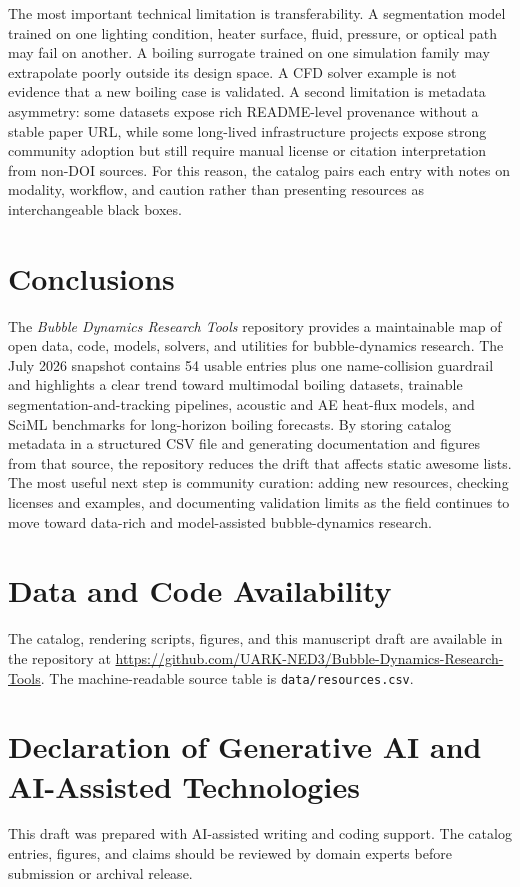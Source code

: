 \documentclass[11pt]{article}
\begin{document}
The most important technical limitation is transferability. A segmentation model trained on one lighting condition, heater surface, fluid, pressure, or optical path may fail on another. A boiling surrogate trained on one simulation family may extrapolate poorly outside its design space. A CFD solver example is not evidence that a new boiling case is validated. A second limitation is metadata asymmetry: some datasets expose rich README-level provenance without a stable paper URL, while some long-lived infrastructure projects expose strong community adoption but still require manual license or citation interpretation from non-DOI sources. For this reason, the catalog pairs each entry with notes on modality, workflow, and caution rather than presenting resources as interchangeable black boxes.

\section{Conclusions}

The \emph{Bubble Dynamics Research Tools} repository provides a maintainable map of open data, code, models, solvers, and utilities for bubble-dynamics research. The July 2026 snapshot contains 54 usable entries plus one name-collision guardrail and highlights a clear trend toward multimodal boiling datasets, trainable segmentation-and-tracking pipelines, acoustic and AE heat-flux models, and SciML benchmarks for long-horizon boiling forecasts. By storing catalog metadata in a structured CSV file and generating documentation and figures from that source, the repository reduces the drift that affects static awesome lists. The most useful next step is community curation: adding new resources, checking licenses and examples, and documenting validation limits as the field continues to move toward data-rich and model-assisted bubble-dynamics research.

\section*{Data and Code Availability}

The catalog, rendering scripts, figures, and this manuscript draft are available in the repository at \url{https://github.com/UARK-NED3/Bubble-Dynamics-Research-Tools}. The machine-readable source table is \texttt{data/resources.csv}.

\section*{Declaration of Generative AI and AI-Assisted Technologies}

This draft was prepared with AI-assisted writing and coding support. The catalog entries, figures, and claims should be reviewed by domain experts before submission or archival release.



\end{document}

